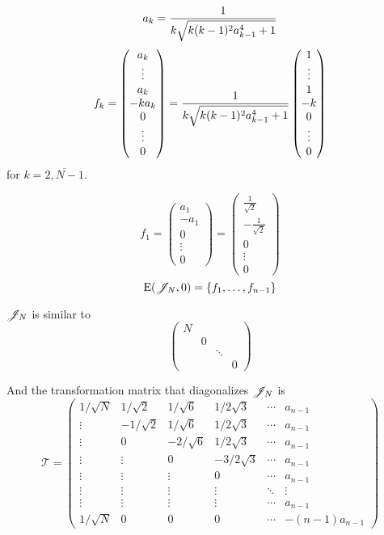 \documentclass{article}
\begin{document}
\begin{propose}
    $$a_k = \frac{1}{k\sqrt{k(k-1)^2 a_{k-1}^4 + 1}}$$
    $$f_k =
    \begin{pmatrix}a_k \\ \vdots \\ a_k \\ -ka_k \\ 0 \\ \vdots \\ 0 \end{pmatrix} =
    \frac{1}{k\sqrt{k(k-1)^2 a_{k-1}^4 + 1}}
    \begin{pmatrix}1 \\ \vdots \\ 1 \\ -k \\ 0 \\ \vdots \\ 0 \end{pmatrix}$$
        for $k=\overline{2,N-1}$.

    $$f_1
    = \begin{pmatrix}a_1 \\ -a_1 \\ 0 \\ \vdots \\ 0 \end{pmatrix}
        = \begin{pmatrix}\frac1{\sqrt2} \\ - \frac{1}{\sqrt2} \\ 0 \\ \vdots \\ 0 \end{pmatrix}
            $$
    $$\mathrm{E}({\mathscr{J}_{N}}, {0}) = \{ f_1, \ldots, f_{n-1} \}$$

    $\mathscr{J}_{N}$ is similar to
    $$\begin{pmatrix}
        N &   &        & \\
        & 0 &        & \\
        &   & \ddots & \\
        &   &        & 0
    \end{pmatrix}$$

    And the transformation matrix that diagonalizes $\mathscr{J}_{N}$ is
    $$\mathcal T =
    \begin{pmatrix}
        1/\sqrt N &  1/\sqrt2 & 1/\sqrt6  & 1/2\sqrt3  & \cdots & a_{n-1} \\
        \vdots    & -1/\sqrt2 & 1/\sqrt6  & 1/2\sqrt3  & \cdots & a_{n-1} \\
        \vdots    & 0         & -2/\sqrt6 & 1/2\sqrt3  & \cdots & a_{n-1} \\
        \vdots    & \vdots    & 0         & -3/2\sqrt3 & \cdots & a_{n-1} \\
        \vdots    & \vdots    & \vdots    & 0          & \cdots & a_{n-1} \\
        \vdots    & \vdots    & \vdots    & \vdots     & \ddots & \vdots  \\
        \vdots    & \vdots    & \vdots    & \vdots     & \cdots & a_{n-1} \\
        1/\sqrt N & 0         & 0         & 0          & \cdots & -(n-1)a_{n-1}
    \end{pmatrix}$$


\end{propose}
\end{document}

